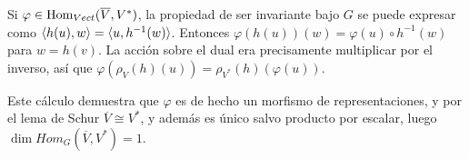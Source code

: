 \documentclass[ANAyTR.tex]{subfiles}
\begin{document}
Si $\varphi\in\operatorname{Hom}_{Vect}(\overline{V},V^*)$, la propiedad de ser invariante bajo $G$ se puede expresar como $\langle{h(u),w}\rangle=\langle{u,h^{-1}(w)}\rangle$. Entonces $\varphi(h(u))(w)=\varphi(u)\circ h^{-1}(w)$ para $w=h(v)$.  La acción sobre el dual era precisamente multiplicar por el inverso, así que $\varphi(\rho_V(h)(u))=\rho_{V^*}(h)(\varphi(u))$. 

Este cálculo demuestra que $\varphi$ es de hecho un morfismo de representaciones, y por el lema de Schur $\overline{V}\cong V^*$, y además es único salvo producto por escalar, luego $\dim Hom_G(\overline{V},V^*)=1$. 
\end{document}
